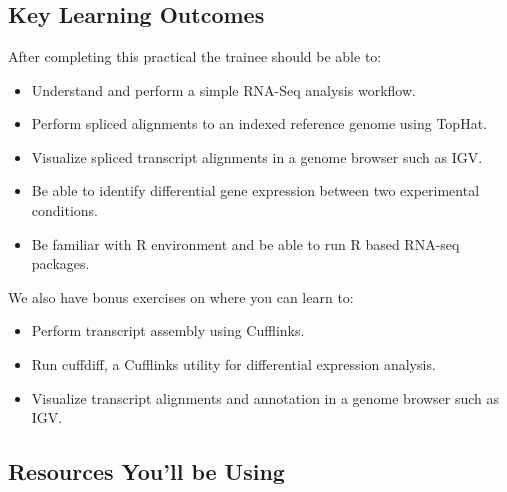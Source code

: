 
\chapter{\moduleTitle}
\newpage

\section{Key Learning Outcomes}

After completing this practical the trainee should be able to:
\begin{itemize}
  \item Understand and perform a simple RNA-Seq analysis workflow.
  \item Perform spliced alignments to an indexed reference genome using TopHat.
  \item  Visualize spliced transcript alignments in a genome browser such as IGV.
  \item Be able to identify differential gene expression between two experimental conditions.
  \item Be familiar with R environment and be able to run R based RNA-seq packages.
\end{itemize}

We also have bonus exercises on where you can learn to:
\begin{itemize}
  \item Perform transcript assembly using Cufflinks.
  \item Run cuffdiff, a Cufflinks utility for differential expression analysis.
  \item Visualize transcript alignments and annotation in a genome browser such as IGV.
\end{itemize}

\section{Resources You'll be Using}
 
